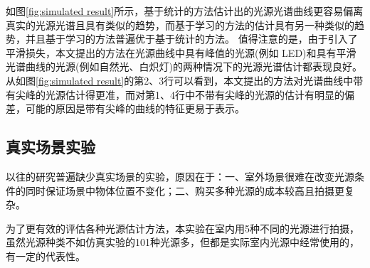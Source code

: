 \documentclass[
    type = master, %
    degree = academic,        %
    decl-page,  %
  ]{njuthesis}
\begin{document}
如图\ref{fig:simulated result}所示，基于统计的方法估计出的光源光谱曲线更容易偏离真实的光源光谱且具有类似的趋势，而基于学习的方法的估计具有另一种类似的趋势，并且基于学习的方法普遍优于基于统计的方法。 值得注意的是，由于引入了平滑损失，本文提出的方法在光源曲线中具有峰值的光源(例如 LED)和具有平滑光谱曲线的光源(例如自然光、白炽灯)的两种情况下的光源光谱估计都表现良好。从如图\ref{fig:simulated result}的第2、3行可以看到，本文提出的方法对光谱曲线中带有尖峰的光源估计得更准，而对第1、4行中不带有尖峰的光源的估计有明显的偏差，可能的原因是带有尖峰的曲线的特征更易于表示。

\subsection{真实场景实验 }

以往的研究普遍缺少真实场景的实验，原因在于：一、室外场景很难在改变光源条件的同时保证场景中物体位置不变化；二、购买多种光源的成本较高且拍摄更复杂。

为了更有效的评估各种光源估计方法，本实验在室内用5种不同的光源进行拍摄，虽然光源种类不如仿真实验的101种光源多，但都是实际室内光源中经常使用的，有一定的代表性。
\end{document}
